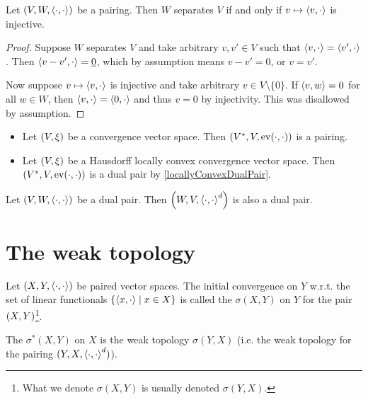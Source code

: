 \begin{lemma} \label{dualSystemInjective}
Let $\left( V,W, \left\langle \cdot,\cdot \right\rangle \right)$ be a pairing. Then $W$ separates $V$ \textup{if and only if} $v\mapsto \left\langle v, \cdot \right\rangle$ is injective.
\end{lemma}
\begin{proof}
Suppose $W$ separates $V$ and take arbitrary $v,v'\in V$ such that $\left\langle v, \cdot \right\rangle = \left\langle v', \cdot \right\rangle$. Then $\left\langle v-v',\cdot \right\rangle = \underline{0}$, which by assumption means $v-v' = 0$, or $v= v'$.

Now suppose $v\mapsto \left\langle v, \cdot \right\rangle$ is injective and take arbitrary $v\in V\setminus\{0\}$. If $\left\langle v,w \right\rangle = 0$ for all $w\in W$, then $\left\langle v,\cdot \right\rangle = \left\langle 0,\cdot \right\rangle$ and thus $v=0$ by injectivity. This was disallowed by assumption.
\end{proof}

\begin{example}
\begin{itemize}
\item Let $\left( V, \xi \right)$ be a convergence vector space. Then $\left( {V}^*, V, \operatorname{ev}(\cdot,\cdot) \right)$ is a pairing.
\item Let $\left( V,\xi \right)$ be a Hausdorff locally convex convergence vector space. Then $\left( {V}^*, V, \operatorname{ev}(\cdot,\cdot) \right)$ is a dual pair by \ref{locallyConvexDualPair}.
\end{itemize}
\end{example}

\begin{lemma}
Let $\left( V,W,\left\langle \cdot,\cdot \right\rangle \right)$ be a dual pair. Then $\left( W,V,\left\langle \cdot,\cdot \right\rangle^d \right)$ is also a dual pair.
\end{lemma}

\section{The weak topology}
\begin{definition}
Let $(X,Y,\left\langle \cdot,\cdot \right\rangle)$ be paired vector spaces. 
The initial convergence on $Y$ w.r.t. the set of linear functionals $\setbuilder{\pair{x,\cdot}}{x\in X}$ is called the  $\sigma(X,Y)$ on $Y$ for the pair $\left( X,Y \right)$\footnote{What we denote $\sigma(X,Y)$ is usually denoted $\sigma(Y,X)$.}.

The  $\sigma^*(X,Y)$ on $X$ is the weak topology $\sigma(Y,X)$ (i.e. the weak topology for the pairing $(Y,X,\left\langle \cdot,\cdot \right\rangle^d)$).
\end{definition}

